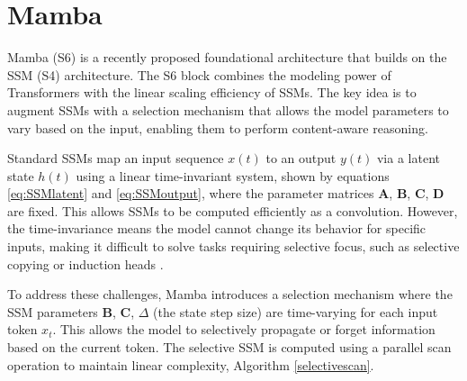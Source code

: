 \documentclass[conference]{IEEEtran}
\begin{document}



\section{Mamba}
Mamba (S6) \cite{gu2023mamba} is a recently proposed foundational architecture that builds on the SSM (S4) architecture. The S6 block combines the modeling power of Transformers with the linear scaling efficiency of SSMs. The key idea is to augment SSMs with a selection mechanism that allows the model parameters to vary based on the input, enabling them to perform content-aware reasoning.

Standard SSMs map an input sequence $x(t)$ to an output $y(t)$ via a latent state $h(t)$ using a linear time-invariant system, shown by equations \eqref{eq:SSMlatent} and \eqref{eq:SSMoutput}, where the parameter matrices $\mathbf{A}$, $\mathbf{B}$, $\mathbf{C}$, $\mathbf{D}$ are fixed. This allows SSMs to be computed efficiently as a convolution. However, the time-invariance means the model cannot change its behavior for specific inputs, making it difficult to solve tasks requiring selective focus, such as selective copying or induction heads \cite{gu2023mamba}.

To address these challenges, Mamba introduces a selection mechanism where the SSM parameters $\mathbf{B}$, $\mathbf{C}$, $\Delta$ (the state step size) are time-varying for each input token $x_t$. This allows the model to selectively propagate or forget information based on the current token. The selective SSM is computed using a parallel scan operation to maintain linear complexity, Algorithm \ref{selectivescan}.
\end{document}
